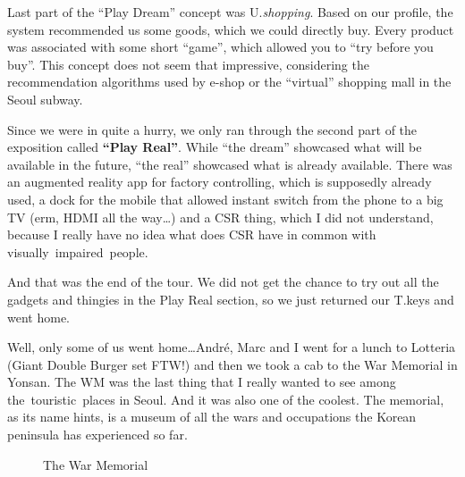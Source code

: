 \begin{post}
\begin{content}

Last part of the ``Play Dream'' concept was U.\textit{shopping}. Based on our profile, the system recommended us some goods, which we could directly buy. Every product was associated with some short ``game'', which allowed you to ``try before you buy''. This concept does not seem that impressive, considering the recommendation algorithms used by e-shop or the ``virtual'' shopping mall in the Seoul subway.

Since we were in quite a hurry, we only ran through the second part of the exposition called \textbf{``Play Real''}. While ``the dream'' showcased what will be available in the future, ``the real'' showcased what is already available. There was an augmented reality app for factory controlling, which is supposedly already used, a dock for the mobile that allowed instant switch from the phone to a big TV (erm, HDMI all the way{\ldots}) and a CSR thing, which I did not understand, because I really have no idea what does CSR have in common with visually impaired people.

And that was the end of the tour. We did not get the chance to try out all the gadgets and thingies in the Play Real section, so we just returned our T.keys and went home.

Well, only some of us went home{\ldots}André, Marc and I went for a lunch to Lotteria (Giant Double Burger set FTW!) and then we took a cab to the War Memorial in Yonsan. The WM was the last thing that I really wanted to see among the touristic places in Seoul. And it was also one of the coolest. The memorial, as its name hints, is a museum of all the wars and occupations the Korean peninsula has experienced so far.

\begin{figure}[!h]
\centering
{}
\caption{The War Memorial}
\end{figure}


\end{content}
\end{post}
